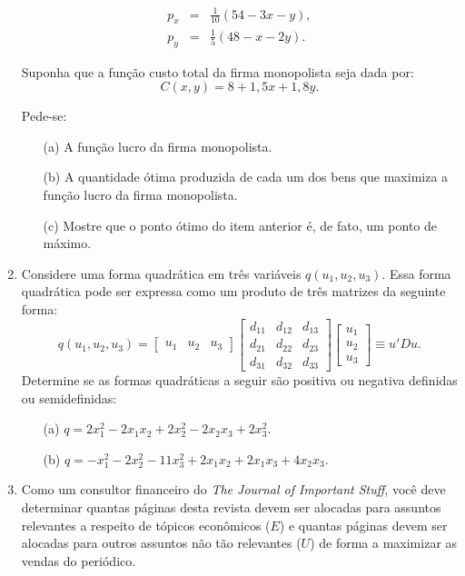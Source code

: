 \documentclass[preprintnumbers,nofootinbib,amsmath,amssymb,12pt]{article}
\begin{document}
\begin{enumerate}
    \begin{eqnarray*}
        p_x &=& \frac{1}{10}(54 - 3x - y), \\
        p_y &=& \frac{1}{5}(48-x-2y).
    \end{eqnarray*}
    
    Suponha que a função custo total da firma monopolista seja dada por:
    \[
    C(x,y) = 8 + 1,5x + 1,8y.
    \]
    
    Pede-se:
    \begin{enumerate}
        \item[(a)] A função lucro da firma monopolista.
        \item[(b)] A quantidade ótima produzida de cada um dos bens que maximiza a função lucro da firma monopolista.
        \item[(c)] Mostre que o ponto ótimo do item anterior é, de fato, um ponto de máximo.
    \end{enumerate}

    \item Considere uma forma quadrática em três variáveis $q(u_1, u_2, u_3)$. Essa forma quadrática pode ser expressa como um produto de três matrizes da seguinte forma:
\[
q(u_1,u_2,u_3) = \begin{bmatrix}
    u_1 & u_2 & u_3
\end{bmatrix} \begin{bmatrix}
    d_{11} & d_{12} & d_{13} \\
    d_{21} & d_{22} & d_{23} \\
    d_{31} & d_{32} & d_{33}
\end{bmatrix}\begin{bmatrix}
    u_1 \\ u_2 \\ u_3
\end{bmatrix} \equiv u'Du.
\]
Determine se as formas quadráticas a seguir são positiva ou negativa definidas ou semidefinidas:
\begin{itemize}
    \item[(a)] $q = 2x_1^2 - 2x_1x_2 + 2x_2^2 - 2x_2x_3 + 2x_3^2$.
    \item[(b)] $q = -x_1^2 - 2x_2^2 - 11x_3^2 + 2x_1x_2 + 2x_1x_3 + 4x_2x_3$.
\end{itemize}

\item Como um consultor financeiro do \emph{The Journal of Important Stuff}, você deve determinar quantas páginas desta revista devem ser alocadas para assuntos relevantes a respeito de tópicos econômicos ($E$) e quantas páginas devem ser alocadas para outros assuntos não tão relevantes ($U$) de forma a maximizar as vendas do periódico.


\end{enumerate}
\end{document}
